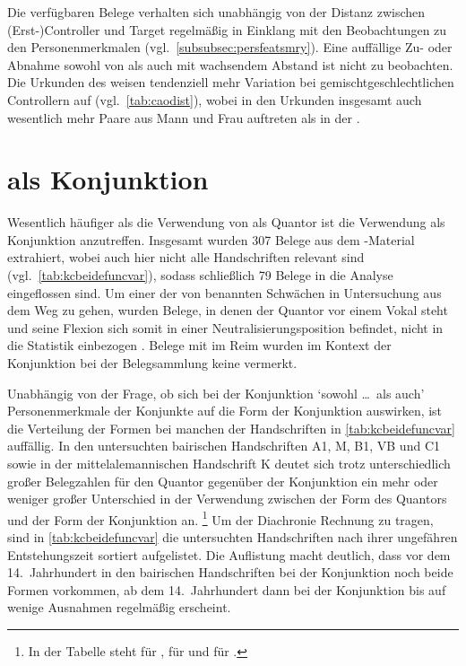 Die verfügbaren Belege verhalten sich unabhängig von der Distanz zwischen
(Erst-)Controller und Target regelmäßig in Einklang mit den Beobachtungen zu den
Personenmerkmalen (vgl.~\cref{subsubsec:persfeatsmry}). Eine auffällige Zu-
oder Abnahme sowohl von  als auch  mit wachsendem
Abstand ist nicht zu beobachten. Die Urkunden des \CAO{}
weisen tendenziell mehr Variation bei gemischtgeschlechtlichen Controllern auf
(vgl.\ \cref{tab:caodist}), wobei in den Urkunden insgesamt auch wesentlich
mehr Paare aus Mann und Frau auftreten als in der \KC{}.


\section{ als Konjunktion}
\label{sec:kckonjunktion}

Wesentlich häufiger als die Verwendung von  als Quantor ist die
Verwendung als Konjunktion anzutreffen. Insgesamt wurden 307 Belege aus dem
\KC{}-Material extrahiert, wobei auch hier nicht alle Handschriften
relevant sind (vgl.~\cref{tab:kcbeidefuncvar}), sodass schließlich 79 Belege in
die Analyse eingeflossen sind. Um einer der von \citet{gjelsten1980} benannten
Schwächen in  Untersuchung aus dem Weg zu gehen, wurden
Belege, in denen der Quantor vor einem Vokal steht und seine Flexion sich somit
in einer Neutralisierungsposition befindet, nicht in die Statistik einbezogen
\autocite[vgl.][191--193, 201]{gjelsten1980}. Belege mit
 im Reim \autocites[vgl.][662--663]{grimm1870}[89]{askedal1973}
wurden im Kontext der Konjunktion bei der Belegsammlung keine vermerkt.

Unabhängig von der Frage, ob sich bei der Konjunktion 
`sowohl \dots\ als auch' Personenmerkmale der Konjunkte auf die Form der
Konjunktion auswirken, ist die Verteilung der Formen bei manchen der
Handschriften in \cref{tab:kcbeidefuncvar} auffällig. In den untersuchten
bairischen Handschriften A1, M, B1,
VB und C1 sowie in der mittelalemannischen Handschrift
K deutet sich trotz unterschiedlich großer Belegzahlen für den
Quantor gegenüber der Konjunktion ein mehr oder weniger großer Unterschied in
der Verwendung zwischen der Form des Quantors und der Form der Konjunktion an.%
%
	\footnote{In der Tabelle steht \q{--} für ,
	\q{(\chk)} für  und \q{\chk} für .}
%
Um der Diachronie Rechnung zu tragen, sind in \cref{tab:kcbeidefuncvar} die
untersuchten Handschriften nach ihrer ungefähren Entstehungszeit sortiert
aufgelistet. Die Auflistung macht deutlich, dass vor dem 14.~Jahrhundert in den
bairischen Handschriften bei der Konjunktion noch beide Formen vorkommen, ab
dem 14.~Jahrhundert dann bei der Konjunktion bis auf wenige Ausnahmen regelmäßig
 erscheint.

